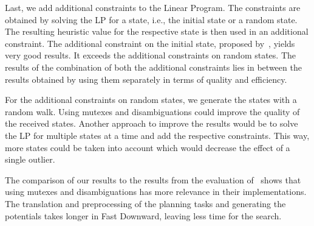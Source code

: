 Last, we add additional constraints to the Linear Program.
The constraints are obtained by solving the LP for a state, i.e., the initial state or a random state.
The resulting heuristic value for the respective state is then used in an additional constraint.
The additional constraint on the initial state, proposed by~\cite{fivser2020strengthening}, yields very good results.
It exceeds the additional constraints on random states.
The results of the combination of both the additional constraints lies in between the results obtained by using them separately in terms of quality and efficiency.

For the additional constraints on random states, we generate the states with a random walk.
Using mutexes and disambiguations could improve the quality of the received states.
Another approach to improve the results would be to solve the LP for multiple states at a time and add the respective constraints.
This way, more states could be taken into account which would decrease the effect of a single outlier.

The comparison of our results to the results from the evaluation of~\cite{fivser2020strengthening} shows that using mutexes and disambiguations has more relevance in their implementations.
The translation and preprocessing of the planning tasks and generating the potentials takes longer in Fast Downward, leaving less time for the search.
